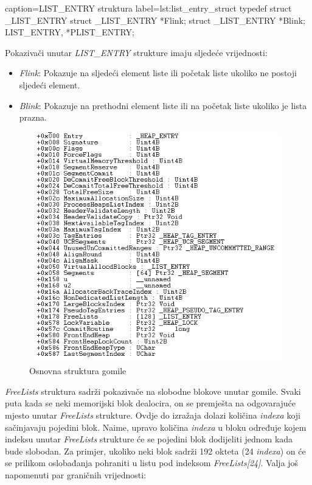 \documentclass[times, utf8, diplomski, numeric]{fer}
\begin{document}
\begin{struktura} {caption=LIST\_ENTRY struktura} {label=lst:list_entry_struct}
typedef struct _LIST_ENTRY {
  struct _LIST_ENTRY  *Flink;
  struct _LIST_ENTRY  *Blink;
} LIST_ENTRY, *PLIST_ENTRY;
\end{struktura}

Pokazivači unutar \emph{LIST\_ENTRY} strukture imaju sljedeće vrijednosti:

\begin{itemize}
\item \emph{Flink}: Pokazuje na sljedeći element liste ili početak liste ukoliko ne postoji sljedeći element.
\item \emph{Blink}: Pokazuje na prethodni element liste ili na početak liste ukoliko je lista prazna.
\end{itemize}

\begin{figure}[!ht]
\centering
\setlength\fboxsep{0pt}
\setlength\fboxrule{0.5pt}
\includegraphics[width=12cm, height=10cm]{slike/heap_structure}
\caption{Osnovna struktura gomile}
\label{fig:heap_structure} 
\end{figure}

\emph{FreeLists} struktura sadrži pokazivače na slobodne blokove
unutar gomile. Svaki puta kada se neki memorijski blok dealocira,
on se premješta na odgovarajuće mjesto unutar \emph{FreeLists}
strukture. Ovdje do izražaja dolazi količina \emph{indexa} koji
sačinjavaju pojedini blok. Naime, upravo količina \emph{indexa} u
bloku određuje kojem indeksu unutar \emph{FreeLists} strukture će
se pojedini blok dodijeliti jednom kada bude slobodan. Za
primjer, ukoliko neki blok sadrži 192 okteta (24 \emph{indexa})
on će se prilikom oslobađanja pohraniti u listu pod indeksom
\emph{FreeLists[24]}. Valja još napomenuti par graničnih
vrijednosti:
\end{document}
